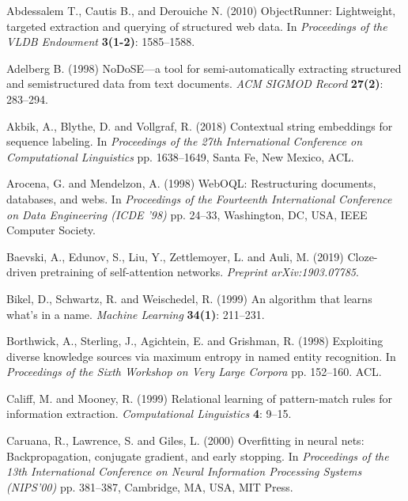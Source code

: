 \documentclass{nle}
\begin{document}
\begin{thebibliography}{}

Abdessalem T., Cautis B., and Derouiche N. (2010)
ObjectRunner: Lightweight, targeted extraction and querying of structured web data.
In {\it Proceedings of the VLDB Endowment}
{\bf 3(1-2)}: 1585--1588.

Adelberg B. (1998)
NoDoSE---a tool for semi-automatically extracting structured and semistructured data from text documents.
{\it ACM SIGMOD Record} 
{\bf 27(2)}: 283--294.

Akbik, A., Blythe, D. and Vollgraf, R. (2018)
Contextual string embeddings for sequence labeling.
In {\it Proceedings of the 27th International Conference on Computational Linguistics}
pp. 1638--1649, Santa Fe, New Mexico, ACL.

Arocena, G. and Mendelzon, A. (1998)
WebOQL: Restructuring documents, databases, and webs.
In {\it Proceedings of the Fourteenth International Conference on Data Engineering (ICDE '98)}
pp. 24--33, Washington, DC, USA, IEEE Computer Society.

Baevski, A., Edunov, S., Liu, Y., Zettlemoyer, L. and Auli, M. (2019)
Cloze-driven pretraining of self-attention networks.
{\it Preprint arXiv:1903.07785}.

Bikel, D., Schwartz, R. and Weischedel, R. (1999)
An algorithm that learns what's in a name.
{\it Machine Learning}
{\bf 34(1)}: 211--231.

Borthwick, A., Sterling, J., Agichtein, E. and Grishman, R. (1998)
Exploiting diverse knowledge sources via maximum entropy in named entity recognition.
In {\it Proceedings of the Sixth Workshop on Very Large Corpora}
pp. 152--160. ACL.

Califf, M. and Mooney, R. (1999)
Relational learning of pattern-match rules for information extraction.
{\it Computational Linguistics}
{\bf 4}: 9--15.

Caruana, R., Lawrence, S. and Giles, L. (2000)
Overfitting in neural nets: Backpropagation, conjugate gradient, and early stopping.
In {\it Proceedings of the 13th International Conference on Neural Information Processing Systems (NIPS'00)}
pp. 381--387, Cambridge, MA, USA, MIT Press.


\end{thebibliography}
\end{document}
